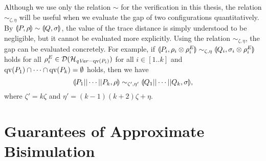 Although we use only the relation $\sim$ for
the verification in this thesis, the relation 
$\sim_{\zeta, \eta}$ will be useful when we
evaluate the gap of two configurations quantitatively.
By $\llparenthesis P, \rho \rrparenthesis\sim \llparenthesis Q, \sigma \rrparenthesis$, the value of the trace distance
is simply
understood to be negligible, but it cannot be evaluated more explicitly.
Using the relation $\sim_{\zeta, \eta}$,
the gap can be evaluated concretely. For example,
if $\llparenthesis P_i, \rho_i \otimes \rho^E_i \rrparenthesis \sim_{\zeta,\eta}
\llparenthesis Q_i, \sigma_i \otimes \rho^E_i \rrparenthesis$ holds
for all $\rho^E_i \in \mathcal{D}(\mathcal{H}_{\mathit{qVar} - \mathrm{qv}(P_i)})$
for all $i \in [1..k]$ and $\mathrm{qv}(P_1) \cap \cdots \cap \mathrm{qv}(P_k) =
\emptyset$ holds, then we have
\[
 \llparenthesis P_1||\cdots||P_k, \rho \rrparenthesis \sim_{\zeta', \eta'}
 \llparenthesis Q_1||\cdots||Q_k, \sigma \rrparenthesis,
\]
where $\zeta' = k\zeta$ and $\eta' = (k-1)(k+2)\zeta + \eta$.

\section{Guarantees of Approximate Bisimulation}
